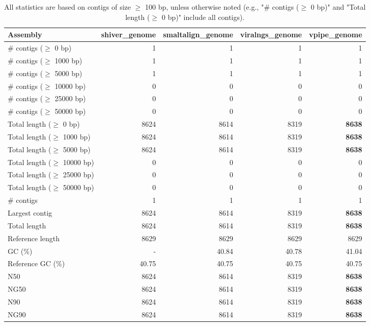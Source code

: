 \documentclass[12pt,a4paper]{article}
\begin{document}
\begin{table}[ht]
\begin{center}
\caption{All statistics are based on contigs of size $\geq$ 100 bp, unless otherwise noted (e.g., "\# contigs ($\geq$ 0 bp)" and "Total length ($\geq$ 0 bp)" include all contigs).}
\begin{tabular}{|l*{4}{|r}|}
\hline
Assembly & shiver\_genome & smaltalign\_genome & viralngs\_genome & vpipe\_genome \\ \hline
\# contigs ($\geq$ 0 bp) & 1 & 1 & 1 & 1 \\ \hline
\# contigs ($\geq$ 1000 bp) & 1 & 1 & 1 & 1 \\ \hline
\# contigs ($\geq$ 5000 bp) & 1 & 1 & 1 & 1 \\ \hline
\# contigs ($\geq$ 10000 bp) & 0 & 0 & 0 & 0 \\ \hline
\# contigs ($\geq$ 25000 bp) & 0 & 0 & 0 & 0 \\ \hline
\# contigs ($\geq$ 50000 bp) & 0 & 0 & 0 & 0 \\ \hline
Total length ($\geq$ 0 bp) & 8624 & 8614 & 8319 & {\bf 8638} \\ \hline
Total length ($\geq$ 1000 bp) & 8624 & 8614 & 8319 & {\bf 8638} \\ \hline
Total length ($\geq$ 5000 bp) & 8624 & 8614 & 8319 & {\bf 8638} \\ \hline
Total length ($\geq$ 10000 bp) & 0 & 0 & 0 & 0 \\ \hline
Total length ($\geq$ 25000 bp) & 0 & 0 & 0 & 0 \\ \hline
Total length ($\geq$ 50000 bp) & 0 & 0 & 0 & 0 \\ \hline
\# contigs & 1 & 1 & 1 & 1 \\ \hline
Largest contig & 8624 & 8614 & 8319 & {\bf 8638} \\ \hline
Total length & 8624 & 8614 & 8319 & {\bf 8638} \\ \hline
Reference length & 8629 & 8629 & 8629 & 8629 \\ \hline
GC (\%) & - & 40.84 & 40.78 & 41.04 \\ \hline
Reference GC (\%) & 40.75 & 40.75 & 40.75 & 40.75 \\ \hline
N50 & 8624 & 8614 & 8319 & {\bf 8638} \\ \hline
NG50 & 8624 & 8614 & 8319 & {\bf 8638} \\ \hline
N90 & 8624 & 8614 & 8319 & {\bf 8638} \\ \hline
NG90 & 8624 & 8614 & 8319 & {\bf 8638} \\ \hline

\end{tabular}
\end{center}
\end{table}
\end{document}
